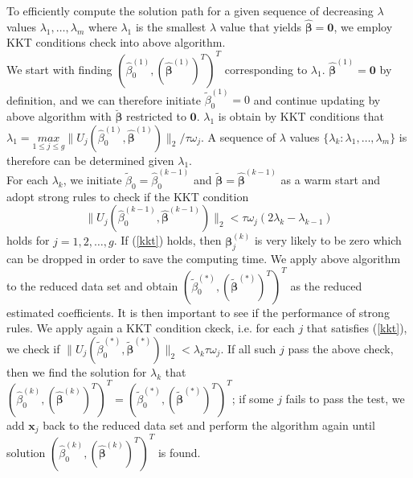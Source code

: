 \documentclass[paper=a4, fontsize=11pt]{scrartcl} %
\begin{document}
To efficiently compute the solution path for a given sequence of decreasing $\lambda$ values ${\lambda_{1},\dots,\lambda_{m}}$ where $\lambda_{1}$ is the smallest $\lambda$ value that yields $\hat{\boldsymbol{\beta}}=\boldsymbol{0}$, we employ KKT conditions check into above algorithm.\\

We start with finding $(\hat{\beta}_{0}^{(1)},(\hat{\boldsymbol{\beta}}^{(1)})^{T})^{T}$ corresponding to $\lambda_{1}$. $\hat{\boldsymbol{\beta}}^{(1)}=\boldsymbol{0}$ by definition, and we can therefore initiate $\tilde{\beta}_{0}^{(1)}=0$ and continue updating by above algorithm with $\breve{\boldsymbol{\beta}}$ restricted to $\boldsymbol{0}$. $\lambda_{1}$ is obtain by KKT conditions that $\lambda_{1}=\underset{1\le j\le g}{max}{\|U_{j}(\hat{\beta}_{0}^{(1)},\hat{\boldsymbol{\beta}}^{(1)})\|_{2}/\tau\omega_{j}}$. A sequence of $\lambda$ values $\{\lambda_{k}:\lambda_{1},\dots,\lambda_{m}\}$ is therefore can be determined given $\lambda_{1}$.\\

For each $\lambda_{k}$, we initiate $\tilde{\beta}_{0}=\hat{\beta}_{0}^{(k-1)}$ and $\tilde{\boldsymbol{\beta}}=\hat{\boldsymbol{\beta}}^{(k-1)}$ as a warm start and adopt strong rules to check if the KKT condition
\begin{equation}\label{kkt}
\|U_{j}(\hat{\beta}_{0}^{(k-1)},\hat{\boldsymbol{\beta}}^{(k-1)})\|_{2}<\tau\omega_{j}(2\lambda_{k}-\lambda_{k-1})
\end{equation}
holds for $j=1,2,\dots,g$. If (\ref{kkt}) holds, then $\boldsymbol{\beta}_{j}^{(k)}$ is very likely to be zero which can be dropped in order to save the computing time. We apply above algorithm to the reduced data set and obtain $(\tilde{\beta}_{0}^{(*)},(\tilde{\boldsymbol{\beta}}^{(*)})^{T})^{T}$ as the reduced estimated coefficients. It is then important to see if the performance of strong rules. We apply again a KKT condition ckeck, i.e. for each $j$ that satisfies (\ref{kkt}), we check if $\|U_{j}(\tilde{\beta}_{0}^{(*)},\tilde{\boldsymbol{\beta}}^{(*)})\|_{2}<\lambda_{k}\tau\omega_{j}$. If all such $j$ pass the above check, then we find the solution for $\lambda_{k}$ that $(\hat{\beta}_{0}^{(k)},(\hat{\boldsymbol{\beta}}^{(k)})^{T})^{T}=(\tilde{\beta}_{0}^{(*)},(\tilde{\boldsymbol{\beta}}^{(*)})^{T})^{T}$; if some $j$ fails to pass the test, we add $\boldsymbol{x}_{j}$ back to the reduced data set and perform the algorithm again until solution $(\hat{\beta}_{0}^{(k)},(\hat{\boldsymbol{\beta}}^{(k)})^{T})^{T}$ is found.
\end{document}
